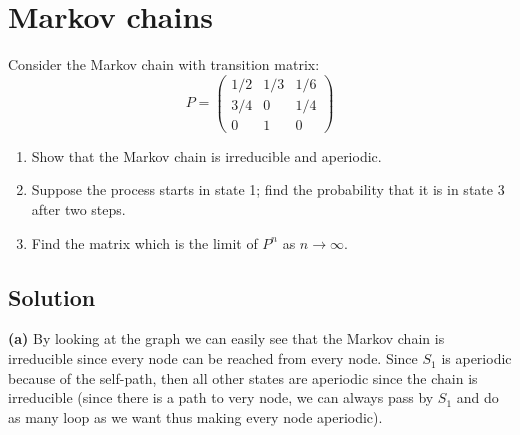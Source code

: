 \documentclass[../main.tex]{subfiles}
\begin{document}
\section{Markov chains}
Consider the Markov chain with transition matrix:
\[
P = \begin{pmatrix}
1/2 & 1/3 & 1/6 \\
3/4 & 0 & 1/4 \\
0 & 1 & 0
\end{pmatrix}
\]
\begin{enumerate}
    \item[(a)] Show that the Markov chain is irreducible and aperiodic.
    \item[(b)] Suppose the process starts in state 1; find the probability that it is in state 3 after two steps.
    \item[(c)] Find the matrix which is the limit of \( P^n \) as \( n \to \infty \).
\end{enumerate}

\subsection{Solution}

\noindent\textbf{(a)} By looking at the graph we can easily see that the Markov chain is irreducible since every node can be reached from every node. Since $S_1$ is aperiodic because of the self-path, then all other states are aperiodic since the chain is irreducible (since there is a path to very node, we can always pass by $S_1$ and do as many loop as we want thus making every node aperiodic).

\begin{center}
\end{center}
\end{document}
